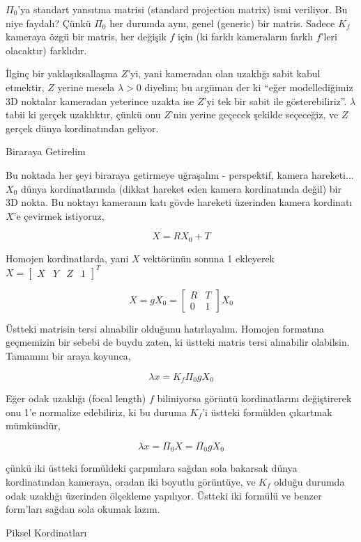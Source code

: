 \documentclass[12pt,fleqn]{article}\usepackage{../../common}
\begin{document}
$\Pi_0$'ya standart yansıtma matrisi (standard projection matrix) ismi
veriliyor. Bu niye faydalı? Çünkü $\Pi_0$ her durumda aynı, genel (generic) bir
matris. Sadece $K_f$ kameraya özgü bir matris, her değişik $f$ için (ki farklı
kameraların farklı $f$'leri olacaktır) farklıdır.

İlginç bir yaklaşıksallaşma $Z$'yi, yani kameradan olan uzaklığı sabit kabul
etmektir, $Z$ yerine mesela $\lambda > 0$ diyelim; bu argüman der ki ``eğer
modellediğimiz 3D noktalar kameradan yeterince uzakta ise $Z$'yi tek bir sabit
ile gösterebiliriz''. $\lambda$ tabii ki gerçek uzaklıktır, çünkü onu $Z$'nin
yerine geçecek şekilde seçeceğiz, ve $Z$ gerçek dünya kordinatından geliyor.

Biraraya Getirelim

Bu noktada her şeyi biraraya getirmeye uğraşalım - perspektif, kamera
hareketi... $X_0$ dünya kordinatlarında (dikkat hareket eden kamera kordinatında
değil) bir 3D nokta. Bu noktayı kameranın katı gövde hareketi üzerinden kamera
kordinatı $X$'e çevirmek istiyoruz,

$$ X = RX_0 + T $$

Homojen kordinatlarda, yani $X$ vektörünün sonuna 1 ekleyerek $X =
\left[\begin{array}{cccc} X&Y&Z&1 \end{array}\right]^T$

$$ X = gX_0 = \left[\begin{array}{rrr}
R & T \\ 0 & 1
\end{array}\right] X_0 $$

Üstteki matrisin tersi alınabilir olduğunu hatırlayalım. Homojen formatına
geçmemizin bir sebebi de buydu zaten, ki üstteki matris tersi alınabilir
olabilsin. Tamamını bir araya koyunca,

$$ \lambda x = K_f \Pi_0 g X_0 $$

Eğer odak uzaklığı (focal length) $f$ biliniyorsa görüntü kordinatlarını
değiştirerek onu 1'e normalize edebiliriz, ki bu duruma $K_f$'i üstteki
formülden çıkartmak mümkündür,

$$ \lambda x = \Pi_0 X = \Pi_0 g X_0 $$

çünkü iki üstteki formüldeki çarpımlara sağdan sola bakarsak dünya
kordinatından kameraya, oradan iki boyutlu görüntüye, ve $K_f$ olduğu
durumda odak uzaklığı üzerinden ölçekleme yapılıyor. Üstteki iki formülü ve
benzer form'ları sağdan sola okumak lazım.

Piksel Kordinatları
\end{document}
